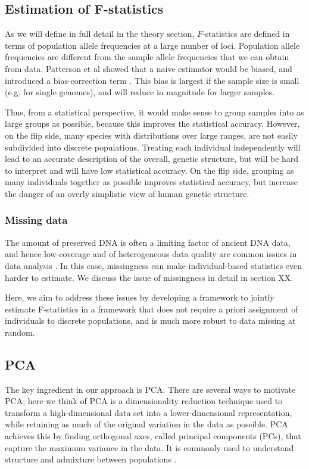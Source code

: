 \documentclass[12pt, letterpaper]{article}
\begin{document}
\subsection{Estimation of F-statistics}\label{intro-fstats-estimation}

As we will define in full detail in the theory section, $F$-statistics are defined in terms of population allele frequencies at a large number of loci. Population allele frequencies are different from the sample allele frequencies that we can obtain from data. Patterson et al showed that a naive estimator would be biased, and introduced a bias-correction term . This bias is largest if the sample size is small (e.g. for single genomes), and will reduce in magnitude for larger samples. 

Thus, from a statistical perspective, it would make sense to group samples into as large groups as possible, because this improves the statistical accuracy. However, on the flip side,  many species with distributions over large ranges, are not easily subdivided into discrete populations. Treating each individual independently will lead to an accurate description of the overall, genetic structure, but will be hard to interpret and will have low statistical accuracy. On the flip side, grouping as many individuals together as possible improves statistical accuracy, but increase the danger of an overly  simplistic view of human genetic structure.


\subsubsection{Missing data}
The amount of preserved DNA is often a limiting factor of ancient DNA data, and hence low-coverage and of heterogeneous data quality are common issues in data analysis  \cite{orlando_ancient_2021}. In this case, missingness can make individual-based statistics even harder to estimate. We discuss the issue of missingness in detail in section XX.

Here, we aim to address these issues by developing a framework to jointly estimate F-statistics in a framework that does not require a priori assignment of individuals to discrete populations, and is much more robust to data missing at random.


\subsection{PCA}
The key ingredient in our approach is PCA. There are several ways to motivate PCA; here we think of PCA is a dimensionality reduction technique used to transform a high-dimensional data set into a lower-dimensional representation, while retaining as much of the original variation in the data as possible. PCA achieves this by finding orthogonal axes, called principal components (PCs), that capture the maximum variance in the data. It is commonly used to understand structure and admixture between populations \cite{patterson_population_2006,novembre_genes_2008,noauthor_cavalli-sforza_nodate,mcvean_genealogical_2009,brisbin_pcadmix_2012}. 
\end{document}
